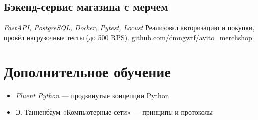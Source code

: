 \documentclass[a4paper,11pt]{article}
\begin{document}
	\subsection*{Бэкенд-сервис магазина с мерчем}
	\textit{FastAPI, PostgreSQL, Docker, Pytest, Locust}  
	Реализовал авторизацию и покупки, провёл нагрузочные тесты (до 500 RPS).  
	\href{https://github.com/dmngwtf/avito_merchshop}{github.com/dmngwtf/avito\_merchshop}
	
	\section*{Дополнительное обучение}
	\begin{itemize}
		\item \textit{Fluent Python} — продвинутые концепции Python
		\item Э. Танненбаум «Компьютерные сети» — принципы и протоколы
	\end{itemize}
	
\end{document}
